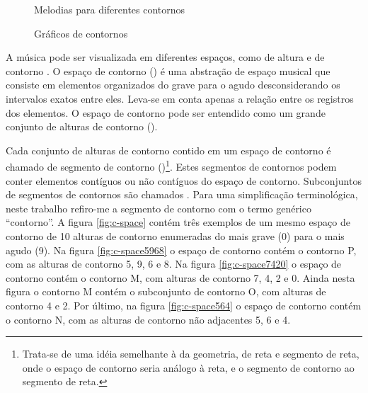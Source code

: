\begin{figure}
  \centering

  \caption{Melodias para diferentes contornos}
  \label{fig:melodias-cseg}
\end{figure}

\begin{figure}
  \centering
  \subfloat[contorno P(5 9 6 8)]{
    \texttt{[image: c-5968]}
    \label{fig:cseg-5968}
  }
  \subfloat[contorno Q(5 7 6 8)]{
    \texttt{[image: c-5768]}
    \label{fig:cseg-5768}
  }
  \subfloat[contorno R(3 0 5 1)]{
    \texttt{[image: c-3051]}

    \label{fig:cseg-3051}
  }
  \caption{Gráficos de contornos}
  \label{fig:graficos-cseg}
\end{figure}

A música pode ser visualizada em diferentes espaços, como de altura e
de contorno \cite{morris87:composition}. O espaço de contorno
() é uma abstração de espaço musical que
consiste em elementos organizados do grave para o agudo
desconsiderando os intervalos exatos entre eles. Leva-se em conta
apenas a relação entre os registros dos elementos. O espaço de
contorno pode ser entendido como um grande conjunto de alturas de
contorno ().

Cada conjunto de alturas de contorno contido em um espaço de contorno
é chamado de segmento de contorno ()\footnote{Trata-se de uma idéia semelhante à da
  geometria, de reta e segmento de reta, onde o espaço de contorno
  seria análogo à reta, e o segmento de contorno ao segmento de
  reta.}. Estes segmentos de contornos podem conter elementos
contíguos ou não contíguos do espaço de contorno. Subconjuntos de
segmentos de contornos são chamados . Para uma simplificação terminológica, neste trabalho
refiro-me a segmento de contorno com o termo genérico ``contorno''. A
figura \ref{fig:c-space} contém três exemplos de um mesmo espaço de
contorno de 10 alturas de contorno enumeradas do mais grave (0) para o
mais agudo (9). Na figura \ref{fig:c-space5968} o espaço de contorno
contém o contorno P, com as alturas de contorno 5, 9, 6 e 8. Na figura
\ref{fig:c-space7420} o espaço de contorno contém o contorno M, com
alturas de contorno 7, 4, 2 e 0. Ainda nesta figura o contorno M
contém o subconjunto de contorno O, com alturas de contorno 4 e 2. Por
último, na figura \ref{fig:c-space564} o espaço de contorno contém o
contorno N, com as alturas de contorno não adjacentes 5, 6 e 4.

